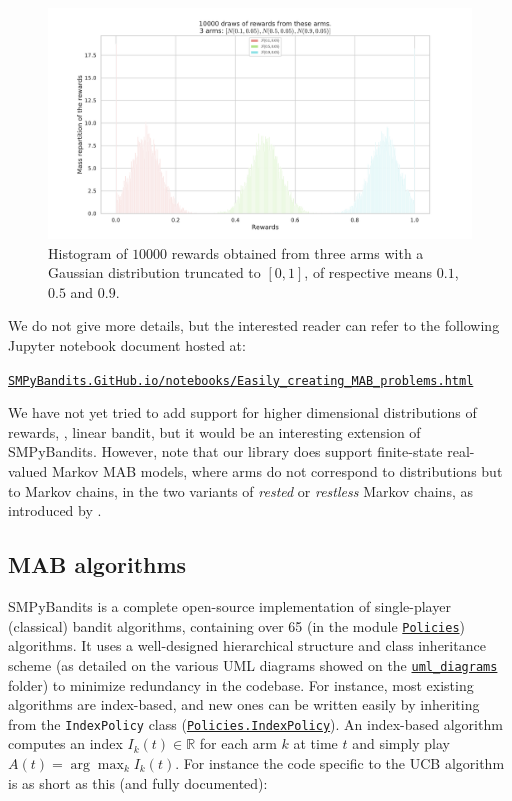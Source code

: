\begin{figure}[h!]  %
	\centering
	\includegraphics[width=0.95\linewidth]{exampleOfRewards.pdf}
	\caption{Histogram of $10000$ \iid{} rewards obtained from three arms with a Gaussian distribution truncated to $[0,1]$, of respective means $0.1$, $0.5$ and $0.9$.}
	\label{fig:3:exampleOfRewards}
\end{figure}


We do not give more details, but the interested reader can refer to the following Jupyter notebook \cite{jupyter} document hosted at:\\
\begin{small}
    \href{https://smpybandits.github.io/notebooks/Easily_creating_MAB_problems.html}{\texttt{SMPyBandits.GitHub.io/notebooks/Easily\_creating\_MAB\_problems.html}}
\end{small}

We have not yet tried to add support for higher dimensional distributions of rewards, \eg, linear bandit, but it would be an interesting extension of SMPyBandits.
%
However, note that our library does support finite-state real-valued Markov MAB models, where arms do not correspond to distributions but to Markov chains, in the two variants of \emph{rested} or \emph{restless} Markov chains, as introduced by \cite{Anantharam87b}.

\subsection{MAB algorithms}

SMPyBandits is a complete open-source implementation of single-player (classical) bandit algorithms,
containing over 65 (in the module \texttt{\href{https://SMPyBandits.GitHub.io/docs/Policies.html}{Policies}}) algorithms.
It uses a well-designed hierarchical structure and class inheritance scheme (as detailed on the various UML diagrams showed on the \texttt{\href{https://SMPyBandits.GitHub.io/uml_diagrams/README.html}{uml\_diagrams}} folder) to minimize redundancy in the codebase.
For instance, most existing algorithms are index-based, and new ones can be written easily by inheriting from the \texttt{IndexPolicy} class (\texttt{\href{https://SMPyBandits.GitHub.io/docs/Policies.IndexPolicy.html}{Policies.IndexPolicy}}).
An index-based algorithm computes an index $I_k(t)\in\mathbb{R}$ for each arm $k$ at time $t$ and simply play $A(t) = \arg\max_k I_k(t)$.
For instance the code specific to the UCB algorithm \cite{LaiRobbins85,Auer02} is as short as this (and fully documented):

